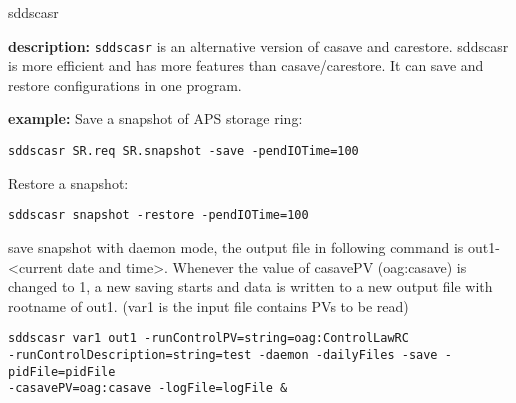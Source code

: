 %
%
\begin{sddsprog}{sddscasr}
\item {\bf description:}
%
%
\verb+sddscasr+ is an alternative version of casave and carestore. sddscasr is
more efficient and has more features than casave/carestore. It can save
and restore configurations in one program.

\item {\bf example:} 
%
% 
%
Save a snapshot of APS storage ring:
\begin{verbatim}
sddscasr SR.req SR.snapshot -save -pendIOTime=100
\end{verbatim}
Restore a snapshot:
\begin{verbatim}
sddscasr snapshot -restore -pendIOTime=100
\end{verbatim}
save snapshot with daemon mode, the output file in following command is out1-<current date and time>.
Whenever the value of casavePV (oag:casave) is changed to 1, a new saving starts and data is written
to a new output file with rootname of out1. (var1 is the input file contains PVs to be read)
\begin{verbatim}
sddscasr var1 out1 -runControlPV=string=oag:ControlLawRC
-runControlDescription=string=test -daemon -dailyFiles -save -pidFile=pidFile
-casavePV=oag:casave -logFile=logFile &
\end{verbatim}


\end{sddsprog}

